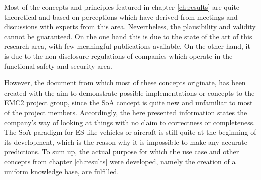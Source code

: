 Most of the concepts and principles featured in chapter \ref{ch:results} are quite theoretical and based on perceptions which have derived from meetings and discussions with experts from this area. Nevertheless, the plausibility and validity cannot be guaranteed. On the one hand this is due to the state of the art of this research area, with few meaningful publications available. On the other hand, it is due to the non-disclosure regulations of companies which operate in the functional safety and security area.

However, the document from which most of these concepts originate, has been created with the aim to demonstrate possible implementations or concepts to the EMC2 project group, since the SoA concept is quite new and unfamiliar to most of the project members. Accordingly, the here presented information states the company's way of looking at things with no claim to correctness or completeness. The SoA paradigm for ES like vehicles or aircraft is still quite at the beginning of its development, which is the reason why it is impossible to make any accurate predictions. 
To sum up, the actual purpose for which the use case and other concepts from chapter \ref{ch:results} were developed, namely the creation of a uniform knowledge base, are fulfilled.